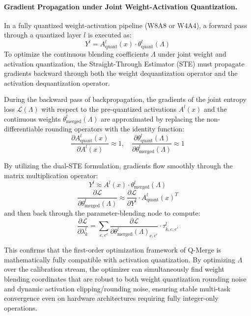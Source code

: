 \paragraph{Gradient Propagation under Joint Weight-Activation Quantization.}
In a fully quantized weight-activation pipeline (W8A8 or W4A4), a forward pass through a quantized layer $l$ is executed as:
\begin{equation}
    Y^l = A^l_{\text{quant}}(x) \cdot \theta^l_{\text{quant}}(\Lambda)
\end{equation}
To optimize the continuous blending coefficients $\Lambda$ under joint weight and activation quantization, the Straight-Through Estimator (STE) must propagate gradients backward through both the weight dequantization operator and the activation dequantization operator.

During the backward pass of backpropagation, the gradients of the joint entropy loss $\mathcal{L}(\Lambda)$ with respect to the pre-quantized activations $A^l(x)$ and the continuous weights $\theta^l_{\text{merged}}(\Lambda)$ are approximated by replacing the non-differentiable rounding operators with the identity function:
\begin{equation}
    \frac{\partial A^l_{\text{quant}}(x)}{\partial A^l(x)} \approx 1, \quad \frac{\partial \theta^l_{\text{quant}}(\Lambda)}{\partial \theta^l_{\text{merged}}(\Lambda)} \approx 1
\end{equation}

By utilizing the dual-STE formulation, gradients flow smoothly through the matrix multiplication operator:
\begin{equation}
    Y^l \approx A^l(x) \cdot \theta^l_{\text{merged}}(\Lambda)
\end{equation}
\begin{equation}
    \frac{\partial \mathcal{L}}{\partial \theta^l_{\text{merged}}(\Lambda)} \approx \frac{\partial \mathcal{L}}{\partial Y^l} \cdot A^l_{\text{quant}}(x)^T
\end{equation}
and then back through the parameter-blending node to compute:
\begin{equation}
    \frac{\partial \mathcal{L}}{\partial \lambda^l_k} = \sum_{c, c'} \frac{\partial \mathcal{L}}{\partial \theta^l_{\text{merged}}(\Lambda)_{c, c'}} \cdot \tau^l_{k, c, c'}
\end{equation}

This confirms that the first-order optimization framework of Q-Merge is mathematically fully compatible with activation quantization. By optimizing $\Lambda$ over the calibration stream, the optimizer can simultaneously find weight blending coordinates that are robust to both weight quantization rounding noise and dynamic activation clipping/rounding noise, ensuring stable multi-task convergence even on hardware architectures requiring fully integer-only operations.

